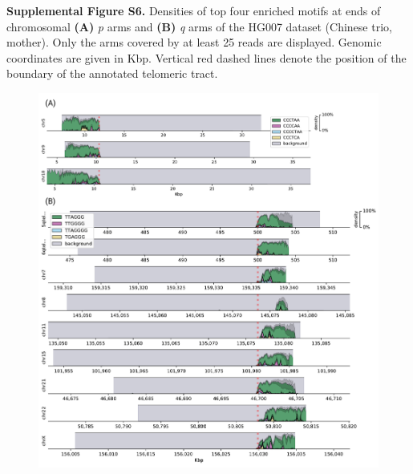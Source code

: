 \documentclass{article}
\begin{document}

\noindent \textbf{Supplemental Figure S6.}
Densities of top four enriched motifs at ends of chromosomal \textbf{(A)} \textit{p} arms and \textbf{(B)} \textit{q} arms of the HG007 dataset (Chinese trio, mother).
Only the arms covered by at least 25 reads are displayed.
Genomic coordinates are given in Kbp.
Vertical red dashed lines denote the position of the boundary of the annotated telomeric tract.

\begin{figure}[h] \centering
\includegraphics[width=\textwidth,keepaspectratio]{renders/figures/Figure-S6.pdf}
\end{figure}
\end{document}
